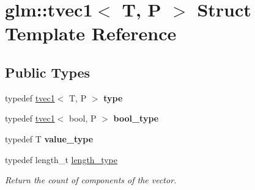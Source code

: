 \hypertarget{structglm_1_1tvec1}{\section{glm\-:\-:tvec1$<$ T, P $>$ Struct Template Reference}
\label{structglm_1_1tvec1}
}
\subsection*{Public Types}
\begin{DoxyCompactItemize}
\item 
\hypertarget{structglm_1_1tvec1_a6f4d9547de6a649e654f93ffa832d9c2}{typedef \hyperlink{structglm_1_1tvec1}{tvec1}$<$ T, P $>$ {\bfseries type}}\label{structglm_1_1tvec1_a6f4d9547de6a649e654f93ffa832d9c2}

\item 
\hypertarget{structglm_1_1tvec1_a0bb296cf2bfb6f0a8623528092e46b59}{typedef \hyperlink{structglm_1_1tvec1}{tvec1}$<$ bool, P $>$ {\bfseries bool\-\_\-type}}\label{structglm_1_1tvec1_a0bb296cf2bfb6f0a8623528092e46b59}

\item 
\hypertarget{structglm_1_1tvec1_a7dd28a7610830a30c358090bde66c848}{typedef T {\bfseries value\-\_\-type}}\label{structglm_1_1tvec1_a7dd28a7610830a30c358090bde66c848}

\item 
\hypertarget{structglm_1_1tvec1_ae6254cf662020a8328b744b40f419527}{typedef length\-\_\-t \hyperlink{structglm_1_1tvec1_ae6254cf662020a8328b744b40f419527}{length\-\_\-type}}\label{structglm_1_1tvec1_ae6254cf662020a8328b744b40f419527}

\begin{DoxyCompactList}\small\item\em Return the count of components of the vector. \end{DoxyCompactList}\end{DoxyCompactItemize}
